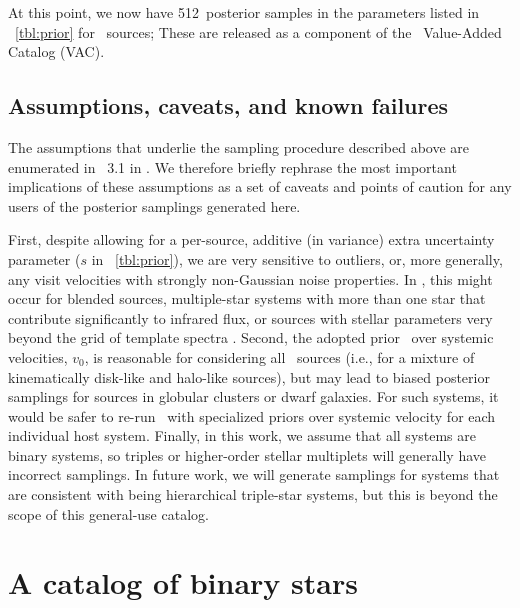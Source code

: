 \documentclass[modern]{aastex63}
\newcommand{\Kminval}{512}
\begin{document}
At this point, we now have \Kminval\ posterior samples in the parameters listed
in \tablename~\ref{tbl:prior} for  \apogee\ sources; These are released
as a component of the \sdss\ Value-Added Catalog (VAC).


\subsection{Assumptions, caveats, and known failures}
\label{sec:caveats}

The assumptions that underlie the sampling procedure described above are
enumerated in \sectionname~3.1 in \cite{Price-Whelan:2018}.
We therefore briefly rephrase the most important implications of these
assumptions as a set of caveats and points of caution for any users of the
posterior samplings generated here.

First, despite allowing for a per-source, additive (in variance) extra
uncertainty parameter ($s$ in \tablename~\ref{tbl:prior}), we are very sensitive
to outliers, or, more generally, any visit velocities with strongly non-Gaussian
noise properties.
In \apogee, this might occur for blended sources, multiple-star systems with
more than one star that contribute significantly to infrared flux, or sources
with stellar parameters very beyond the grid of template spectra
\citep{Nidever:2015}.
Second, the adopted prior \pdf\ over systemic velocities, $v_0$, is reasonable
for considering all \apogee\ sources (i.e., for a mixture of kinematically
disk-like and halo-like sources), but may lead to biased posterior samplings for
sources in globular clusters or dwarf galaxies.
For such systems, it would be safer to re-run \thejoker\ with specialized priors
over systemic velocity for each individual host system.
Finally, in this work, we assume that all systems are binary systems, so triples
or higher-order stellar multiplets will generally have incorrect samplings.
In future work, we will generate samplings for systems that are consistent with
being hierarchical triple-star systems, but this is beyond the scope of this
general-use catalog.


\section{A catalog of binary stars} \label{sec:catalog}
\end{document}
